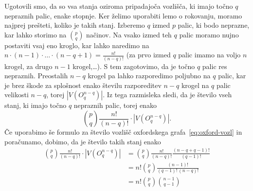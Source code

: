 \documentclass[12pt,a4paper]{amsart}
\theoremstyle{definition} %
\theoremstyle{plain} %
\begin{document}
    Ugotovili smo, da so vsa stanja oziroma pripadajoča vozlišča, ki imajo točno $q$ nepraznih palic, enake stopnje. Ker želimo uporabiti lemo o rokovanju, moramo najprej prešteti, koliko je takih stanj. 
    Izberemo $q$ izmed $p$ palic, ki bodo neprazne, kar lahko storimo na ${p \choose q}$ načinov. Na vsako izmed teh $q$ palic moramo nujno postaviti vsaj eno kroglo, kar lahko naredimo na $n \cdot (n-1) \cdot \ldots \cdot (n-q+1) = \frac{n!}{(n-q)!}$ (za prvo izmed $q$ palic imamo na voljo $n$ krogel, za drugo $n-1$ krogel,\ldots). S tem zagotovimo, da je točno $q$ palic res nepraznih. Preostalih $n-q$ krogel pa lahko razporedimo poljubno na $q$ palic, kar je brez škode za splošnost enako številu razporeditev $n-q$ krogel na $q$ palic velikosti $n-q$, torej $|V(O^{n-q}_q)|$.
    Iz tega razmisleka sledi, da je število vseh stanj, ki imajo točno $q$ nepraznih palic, torej enako
    \[{p \choose q} \frac{n!}{(n-q)!} \cdot |V(O^{n-q}_q)|.\]
    Če uporabimo še formulo za število vozlišč oxfordskega grafa~\eqref{eq:oxford-vozl} in poračunamo, dobimo, da je število takih stanj enako
    \begin{align*}
        {p \choose q} \frac{n!}{(n-q)!} \cdot |V(O^{n-q}_q)| &=
        {p \choose q} \frac{n!}{(n-q)!} \frac{(n-q+q-1)!}{(q-1)!} \\ &= n! {p \choose q} \frac{(n-1)!}{(q-1)!\,(n-q)!} \\ &=
        n! {p \choose q} {n-1 \choose q-1}
    \end{align*}
\end{document}
